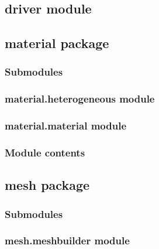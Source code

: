 \documentclass[letterpaper,10pt,english]{sphinxmanual}
\begin{document}
\subsection{driver module}
\label{\detokenize{driver:driver-module}}\label{\detokenize{driver::doc}}

\subsection{material package}
\label{\detokenize{material:material-package}}\label{\detokenize{material::doc}}

\subsubsection{Submodules}
\label{\detokenize{material:submodules}}

\subsubsection{material.heterogeneous module}
\label{\detokenize{material:material-heterogeneous-module}}

\subsubsection{material.material module}
\label{\detokenize{material:material-material-module}}

\subsubsection{Module contents}
\label{\detokenize{material:module-material}}\label{\detokenize{material:module-contents}}

\subsection{mesh package}
\label{\detokenize{mesh:mesh-package}}\label{\detokenize{mesh::doc}}

\subsubsection{Submodules}
\label{\detokenize{mesh:submodules}}

\subsubsection{mesh.meshbuilder module}
\label{\detokenize{mesh:mesh-meshbuilder-module}}
\end{document}
